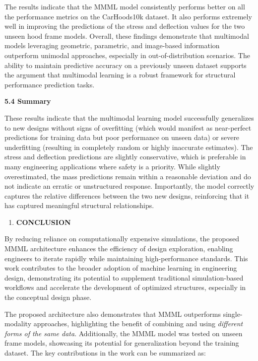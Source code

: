 \documentclass[11pt]{article}
\begin{document}
The results indicate that the MMML model consistently performs better on
all the performance metrics on the CarHoods10k dataset. It also performs
extremely well in improving the predictions of the stress and deflection
values for the two unseen hood frame models. Overall, these findings
demonstrate that multimodal models leveraging geometric, parametric, and
image-based information outperform unimodal approaches, especially in
out-of-distribution scenarios. The ability to maintain predictive
accuracy on a previously unseen dataset supports the argument that
multimodal learning is a robust framework for structural performance
prediction tasks.

\textbf{5.4 Summary}

These results indicate that the multimodal learning model successfully
generalizes to new designs without signs of overfitting (which would
manifest as near-perfect predictions for training data but poor
performance on unseen data) or severe underfitting (resulting in
completely random or highly inaccurate estimates). The stress and
deflection predictions are slightly conservative, which is preferable in
many engineering applications where safety is a priority. While slightly
overestimated, the mass predictions remain within a reasonable deviation
and do not indicate an erratic or unstructured response. Importantly,
the model correctly captures the relative differences between the two
new designs, reinforcing that it has captured meaningful structural
relationships.

\begin{enumerate}
\def\labelenumi{\arabic{enumi}.}
\setcounter{enumi}{5}
\item
  \textbf{CONCLUSION}
\end{enumerate}

By reducing reliance on computationally expensive simulations, the
proposed MMML architecture enhances the efficiency of design
exploration, enabling engineers to iterate rapidly while maintaining
high-performance standards. This work contributes to the broader
adoption of machine learning in engineering design, demonstrating its
potential to supplement traditional simulation-based workflows and
accelerate the development of optimized structures, especially in the
conceptual design phase.

The proposed architecture also demonstrates that MMML outperforms
single-modality approaches, highlighting the benefit of combining and
using \emph{different forms of the same data}. Additionally, the MMML
model was tested on unseen frame models, showcasing its potential for
generalization beyond the training dataset. The key contributions in the
work can be summarized as:
\end{document}
